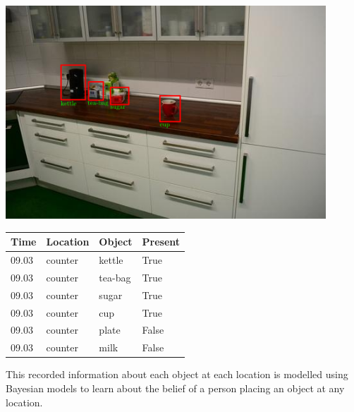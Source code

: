   
  \begin{minipage}{\textwidth}
  \begin{minipage}[b]{0.49\textwidth}
    \centering
        \includegraphics[width=0.9\textwidth]{images/counter_ano.png}

    \label{fig:counter_scan}
  \end{minipage}
  \hfill
  \begin{minipage}[b]{0.49\textwidth}
    \centering
    \begin{tabular}{|l|l|l|l|}
        \hline
	        Time & Location & Object & Present\\
        \hline
        \hline
	        09.03 & counter & kettle & True\\
        \hline
	        09.03 & counter & tea-bag & True\\
        \hline
	        09.03 & counter & sugar & True\\
        \hline
	        09.03 & counter & cup & True\\
        \hline
	        09.03 & counter & plate & False\\
        \hline
	        09.03 & counter & milk & False\\
        \hline
        \end{tabular}
      \label{tab:robot_record}
    \end{minipage}
  \end{minipage}



This recorded information about each object at each location is modelled using Bayesian models to learn about the belief of a person placing an object at any location.

